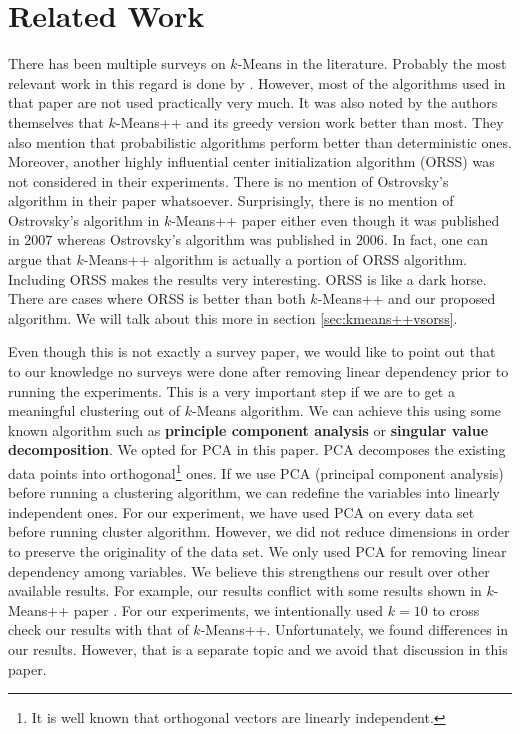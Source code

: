 \documentclass[twoside, 11pt]{article}
\begin{document}
	\section{Related Work}
	There has been multiple surveys on $k$-Means in the literature. Probably the most relevant work in this regard is done by \cite{celebi}. However, most of the algorithms used in that paper are not used practically very much. It was also noted by the authors themselves that $k$-Means++ and its greedy version work better than most. They also mention that probabilistic algorithms perform better than deterministic ones. Moreover, another highly influential center initialization algorithm \citep{ostrovsky} (ORSS) was not considered in their experiments. There is no mention of Ostrovsky's algorithm in their paper whatsoever. Surprisingly, there is no mention of Ostrovsky's algorithm in $k$-Means++ paper either even though it was published in $2007$ whereas Ostrovsky's algorithm was published in $2006$. In fact, one can argue that $k$-Means++ algorithm is actually a portion of ORSS algorithm. Including ORSS makes the results very interesting. ORSS is like a dark horse. There are cases where ORSS is better than both $k$-Means++ and our proposed algorithm. We will talk about this more in section \eqref{sec:kmeans++vsorss}.
	
	Even though this is not exactly a survey paper, we would like to point out that to our knowledge no surveys were done after removing linear dependency prior to running the experiments. This is a very important step if we are to get a meaningful clustering out of $k$-Means algorithm. We can achieve this using some known algorithm such as \textbf{principle component analysis} or \textbf{singular value decomposition}. We opted for PCA in this paper. PCA decomposes the existing data points into orthogonal\footnote{It is well known that orthogonal vectors are linearly independent.} ones. If we use PCA (principal component analysis) before running a clustering algorithm, we can redefine the variables into linearly independent ones. For our experiment, we have used PCA on every data set before running cluster algorithm. However, we did not reduce dimensions in order to preserve the originality of the data set. We only used PCA for removing linear dependency among variables. We believe this strengthens our result over other available results. For example, our results conflict with some results shown in $k$-Means++ paper \cite{kmeans++}. For our experiments, we intentionally used $k=10$ to cross check our results with that of $k$-Means++. Unfortunately, we found differences in our results. However, that is a separate topic and we avoid that discussion in this paper.
\end{document}
